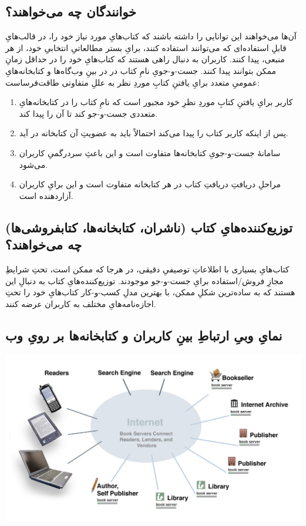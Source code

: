 \documentclass[]{article}
\begin{document}
\subsection{خوانندگان چه می‌خواهند؟}
آن‌ها می‌خواهند این توانایی را داشته باشند که کتاب‌هایِ مورد نیاز خود را، در قالب‌هایِ قابلِ استفاده‌ای که می‌توانند استفاده کنند، برایِ بستر مطالعاتیِ انتخابیِ خود، از هر منبعی، پیدا کنند. کاربران به دنبال راهی هستند که کتاب‌هایِ خود را در حداقل زمانِ ممکن بتوانند پیدا کنند. جست-و-جویِ نامِ کتاب در در بینِ وب‌گاه‌ها و کتابخانه‌هایِ عمومیِ متعدد برایِ یافتنِ کتابِ موردِ نظر به عللِ متفاوتی طاقت‌فرساست:
\begin{enumerate}
	\item کاربر برایِ یافتنِ کتابِ موردِ نظرِ خود مجبور است که نامِ کتاب را در کتابخانه‌هایِ متعددی جست-و-جو کند تا آن را پیدا کند.
	\item پس از اینکه کاربر کتاب را پیدا می‌کند احتمالاً باید به عضویتِ آن کتابخانه در آید.
	\item سامانهٔ جست-و-جویِ کتابخانه‌ها متفاوت است و این باعثِ سردرگمیِ کاربران می‌شود.
	\item مراحلِ دریافتِ دریافتِ کتاب در هر کتابخانه متفاوت است و این برایِ کاربران آزاردهنده است.
\end{enumerate}
\subsection{توزیع‌کننده‌هایِ کتاب (ناشران، کتابخانه‌ها، کتابفروشی‌ها) چه می‌خواهند؟}
کتاب‌هایِ بسیاری با اطلاعاتِ توصیفیِ دقیقی، در هرجا که ممکن است، تحتِ شرایطِ مجازِ فروش/استفاده برایِ جست‌-‌و-‌جو موجودند. توزیع‌کننده‌هایِ کتاب به دنبالِ این هستند که به ساده‌ترین شکلِ ممکن، با بهترین مدلِ کسب-و-کار کتاب‌هایِ خود را تحتِ اجازه‌نامه‌هایِ مختلف به کاربران عرضه کنند.
\subsection{نمایِ وبیِ ارتباطِ بینِ کاربران و کتابخانه‌ها بر رویِ وب}
\includegraphics[scale=0.25]{web-of-books.png}
\end{document}
